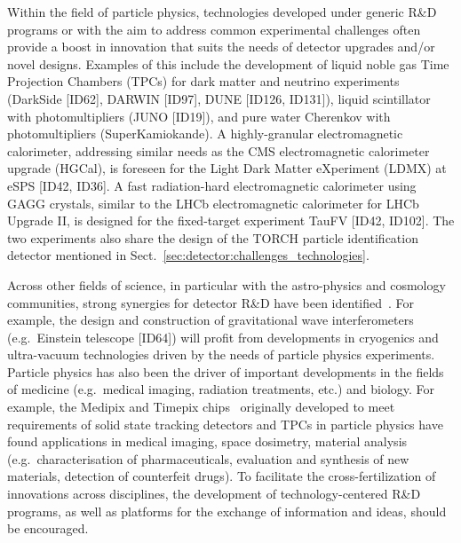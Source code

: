Within the field of particle physics, technologies developed under generic R\&D programs or with the aim to address common experimental challenges often provide a boost in innovation that suits the needs of detector upgrades and/or novel designs. Examples of this include the development of liquid noble gas Time Projection Chambers (TPCs) for dark matter and neutrino experiments (DarkSide [ID62], DARWIN [ID97], DUNE [ID126, ID131]), liquid scintillator with photomultipliers (JUNO [ID19]), and pure water Cherenkov with photomultipliers (SuperKamiokande). A highly-granular electromagnetic calorimeter, addressing similar needs as the CMS electromagnetic calorimeter upgrade (HGCal), is foreseen for the Light Dark Matter eXperiment (LDMX) at eSPS [ID42, ID36]. A fast radiation-hard electromagnetic calorimeter using GAGG crystals, similar to the LHCb electromagnetic calorimeter for LHCb Upgrade II, is designed for the fixed-target experiment TauFV [ID42, ID102]. The two experiments also share the design of the TORCH particle identification detector mentioned in  Sect.~\ref{sec:detector:challenges_technologies}.

Across other fields of science, in particular with the astro-physics and cosmology communities, strong synergies for detector R\&D have been identified~\cite{bib:CDV-talk}. %
For example, the design and construction of gravitational wave interferometers (e.g.\ Einstein telescope [ID64]) will profit from developments in cryogenics and ultra-vacuum technologies driven by the needs of particle physics experiments.  Particle physics has also been the driver of important developments in the fields of medicine (e.g.\ medical imaging, radiation treatments, etc.) and biology. For example, the Medipix and Timepix chips~\cite{bib:medipix} originally developed to meet requirements of solid state tracking detectors and TPCs in particle physics have found applications in medical imaging, space dosimetry, material analysis (e.g.\ characterisation of pharmaceuticals, evaluation and synthesis of new materials, detection of counterfeit drugs). To facilitate the cross-fertilization of innovations across disciplines, the development of technology-centered R\&D programs, as well as platforms for the exchange of information and ideas, should be encouraged.

